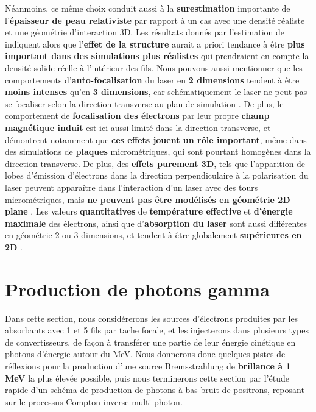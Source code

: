 \begin{refsection}
Néanmoins, ce même choix conduit aussi à la \textbf{surestimation} importante de l'\textbf{épaisseur de peau relativiste} par rapport à un cas avec une densité réaliste et une géométrie d'interaction 3D. Les résultats donnés par l'estimation de \cite{lecz_2018} indiquent alors que l'\textbf{effet de la structure} aurait a priori tendance à être \textbf{plus important dans des simulations plus réalistes} qui prendraient en compte la densité solide réelle à l'intérieur des fils. Nous pouvons aussi mentionner que les comportements d'\textbf{auto-focalisation} du laser en \textbf{2 dimensions} tendent à être \textbf{moins intenses} qu'en \textbf{3 dimensions}, car schématiquement le laser ne peut pas se focaliser selon la direction transverse au plan de simulation \parencite{fedeli_2018c}. De plus, le comportement de \textbf{focalisation des électrons} par leur propre \textbf{champ magnétique induit} est ici aussi limité dans la direction transverse, et \cite{jiang_2014} démontrent notamment que \textbf{ces effets jouent un rôle important}, même dans des simulations de \textbf{plaques} micrométriques, qui sont pourtant homogènes dans la direction transverse. De plus, des \textbf{effets purement 3D}, tels que l'apparition de lobes d'émission d'électrons dans la direction perpendiculaire à la polarisation du laser peuvent apparaître dans l'interaction d'un laser avec des tours micrométriques, mais \textbf{ne peuvent pas être modélisés en géométrie 2D plane} \parencite{jiang_2014}. Les valeurs \textbf{quantitatives} de \textbf{température effective} et \textbf{d'énergie maximale} des électrons, ainsi que d'\textbf{absorption du laser} sont aussi différentes en géométrie 2 ou 3 dimensions, et tendent à être globalement \textbf{supérieures en 2D} \parencite{fedeli_2018c, jiang_2014}.

\section{Production de photons gamma}

Dans cette section, nous considérerons les sources d'électrons produites par les absorbants avec 1 et 5 fils par tache focale, et les injecterons dans plusieurs types de convertisseurs, de façon à transférer une partie de leur énergie cinétique en photons d'énergie autour du MeV.
Nous donnerons donc quelques pistes de réflexions pour la production d'une source Bremsstrahlung de \textbf{brillance à 1 MeV} la plus élevée possible, puis nous terminerons cette section par l'étude rapide d'un schéma de production de photons à bas bruit de positrons, reposant sur le processus Compton inverse multi-photon.


\end{refsection}
